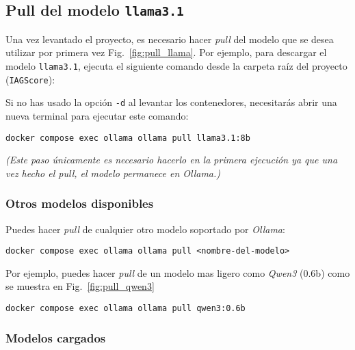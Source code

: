 

\subsection{Pull del modelo \texttt{llama3.1}}{\label{sec:pull_model}}

Una vez levantado el proyecto, es necesario hacer \emph{pull} del modelo que se desea utilizar por primera vez Fig.~\ref{fig:pull_llama}. 
Por ejemplo, para descargar el modelo \texttt{llama3.1}, ejecuta el siguiente comando desde la carpeta raíz del proyecto (\texttt{IAGScore}):

Si no has usado la opción \texttt{-d} al levantar los contenedores, necesitarás abrir una nueva terminal para ejecutar este comando:

\begin{verbatim}
docker compose exec ollama ollama pull llama3.1:8b
\end{verbatim}


\emph{(Este paso únicamente es necesario hacerlo en la primera ejecución ya que una vez hecho el pull, el modelo permanece en Ollama.)}

\subsubsection*{Otros modelos disponibles}

Puedes hacer \emph{pull} de cualquier otro modelo soportado por \textit{Ollama}:

\begin{verbatim}
docker compose exec ollama ollama pull <nombre-del-modelo>
\end{verbatim}

Por ejemplo, puedes hacer \textit{pull} de un modelo mas ligero como \textit{Qwen3} (0.6b) como se muestra en Fig.~\ref{fig:pull_qwen3}

\begin{verbatim}
docker compose exec ollama ollama pull qwen3:0.6b
\end{verbatim}


\subsubsection*{Modelos cargados}

